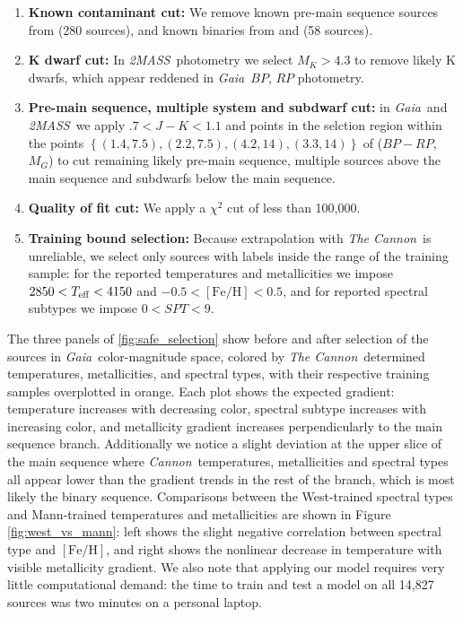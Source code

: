 \documentclass[modern]{aastex62}
\newcommand{\thecannon}{\textsl{The Cannon}}
\newcommand{\cannon}{\textsl{Cannon}}
\newcommand{\gaia}{\textsl{Gaia}}
\newcommand{\zmass}{\textsl{2MASS}}
\newcommand{\feh}{[{\mathrm{Fe}/\mathrm{H}}]}
\begin{document}
\begin{enumerate}
\item \textbf{Known contaminant cut:} We remove known pre-main sequence sources from \citealt{Cottaar:2014} (280 sources), and known binaries from \citealt{ElBadry:2018} and \citealt{Skinner:2018} (58 sources).

\item \textbf{K dwarf cut:} In \zmass\ photometry we select $M_K > 4.3$ to remove likely K dwarfs, which appear reddened in \gaia\ $BP$, $RP$ photometry.

\item \textbf{Pre-main sequence, multiple system and subdwarf cut:} in \gaia\ and \zmass\ we apply $.7<J-K<1.1$ and points in the selction region within the points $\left\{ (1.4, 7.5), (2.2, 7.5), (4.2, 14), (3.3, 14) \right\}$ of ($BP-RP$, $M_G$) to cut remaining likely pre-main sequence, multiple sources above the main sequence and subdwarfs below the main sequence.

\item \textbf{Quality of fit cut:} We apply a $\chi^2$ cut of less than 100,000.

\item \textbf{Training bound selection:} Because extrapolation with \thecannon\ is unreliable, we select only sources with labels inside the range of the training sample: for the reported temperatures and metallicities we impose $2850<T_{\rm eff}<4150$ and $-0.5<\feh<0.5$, and for reported spectral subtypes we impose $0<SPT<9$.
\end{enumerate}

The three panels of \ref{fig:safe_selection} show before and after selection of the sources in \gaia\ color-magnitude space, colored by \thecannon\ determined temperatures, metallicities, and spectral types, with their respective training samples overplotted in orange. Each plot shows the expected gradient: temperature increases with decreasing color, spectral subtype increases with increasing color, and metallicity gradient increases perpendicularly to the main sequence branch. Additionally we notice a slight deviation at the upper slice of the main sequence where \cannon\ temperatures, metallicities and spectral types all appear lower than the gradient trends in the rest of the branch, which is most likely the binary sequence. Comparisons between the West-trained spectral types and Mann-trained temperatures and metallicities are shown in Figure \ref{fig:west_vs_mann}: left shows the slight negative correlation between spectral type and $\feh$, and right shows the nonlinear decrease in temperature with visible metallicity gradient. We also note that applying our model requires very little computational demand: the time to train and test a model on all 14,827 sources was two minutes on a personal laptop. 
\end{document}
